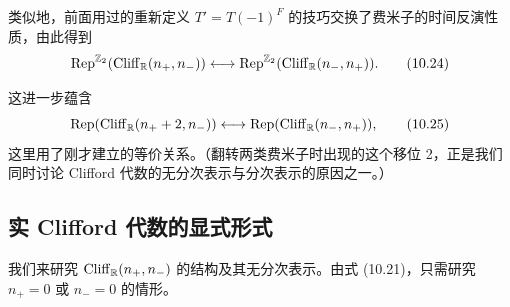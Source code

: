 类似地，前面用过的重新定义 $T'=T(-1)^F$ 的技巧交换了费米子的时间反演性质，由此得到
\begin{equation}
  \operatorname{Rep}^{\mathbb{Z}_2}(\mathrm{Cliff}_{\mathbb{R}}(n_+,n_-))
  \longleftrightarrow \operatorname{Rep}^{\mathbb{Z}_2}(\mathrm{Cliff}_{\mathbb{R}}(n_-,n_+)).
  \tag{10.24}
\end{equation}

这进一步蕴含
\begin{equation}
  \operatorname{Rep}(\mathrm{Cliff}_{\mathbb{R}}(n_++2,n_-))
  \longleftrightarrow \operatorname{Rep}(\mathrm{Cliff}_{\mathbb{R}}(n_-,n_+)),
  \tag{10.25}
\end{equation}
这里用了刚才建立的等价关系。（翻转两类费米子时出现的这个移位 2，正是我们同时讨论 Clifford 代数的无分次表示与分次表示的原因之一。）

\subsection{实 Clifford 代数的显式形式}

我们来研究 $\mathrm{Cliff}_{\mathbb{R}}(n_+,n_-)$ 的结构及其无分次表示。由式 (10.21)，只需研究 $n_+=0$ 或 $n_-=0$ 的情形。

